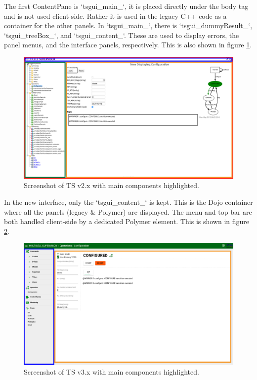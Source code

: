The first ContentPane is `tsgui\_main\_`, it is placed directly under the body tag
and is not used client-side. Rather it is used in the legacy C++ code as a
container for the other panels.
In `tsgui\_main\_`, there is `tsgui\_dummyResult\_`, `tsgui\_treeBox\_`, and `tsgui\_content\_`.
These are used to display errors, the panel menus, and the interface panels,
respectively. This is also shown in figure \ref{fig:ts2_structure}.
\begin{figure}
  \centering
  \includegraphics[width=\textwidth]{images/ts2_structure}
  \caption{Screenshot of TS v2.x with main components highlighted.}
  \label{fig:ts2_structure}
\end{figure}

In the new interface, only the `tsgui\_content\_` is kept. This is the Dojo container
where all the panels (legacy & Polymer) are displayed. The menu and top bar
are both handled client-side by a dedicated Polymer element. This is shown in
figure \ref{fig:ts3_structure}.
\begin{figure}
  \centering
  \includegraphics[width=\textwidth]{images/ts3_structure}
  \caption{Screenshot of TS v3.x with main components highlighted.}
  \label{fig:ts3_structure}
\end{figure}

